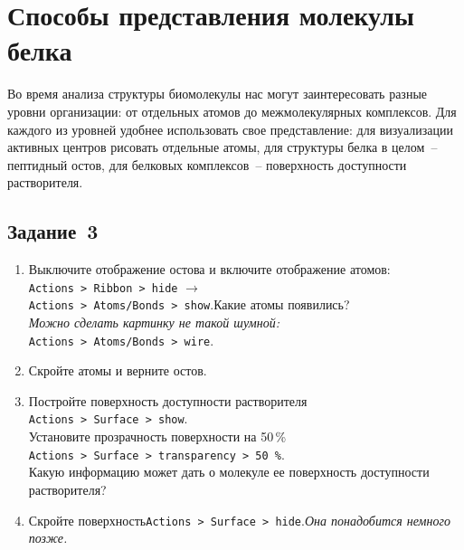 \section{Способы представления молекулы белка}
Во время анализа структуры биомолекулы нас могут заинтересовать разные уровни
организации: от отдельных атомов до межмолекулярных комплексов. Для каждого из уровней удобнее использовать свое представление:
для визуализации активных центров рисовать отдельные атомы, для структуры белка в целом~-- пептидный остов, для белковых
комплексов~-- поверхность доступности растворителя.

\subsection*{Задание~3}
\begin{enumerate}
    \item Выключите отображение остова и включите отображение атомов:\\\quad\texttt{Actions~> Ribbon~> hide}\quad
    $\rightarrow$\\\quad\texttt{Actions~> Atoms/Bonds~> show}.\quad Какие атомы появились? \\
    \textit{Можно сделать картинку не такой шумной:}\\\quad\texttt{Actions~> Atoms/Bonds~> wire}.
    \item Скройте атомы и верните остов.
    \item Постройте поверхность доступности растворителя\\\quad\texttt{Actions~> Surface~> show}.\quad\\ Установите прозрачность поверхности на 50\,\%\\
    \quad\texttt{Actions~> Surface~> transparency~> 50\,\%}.\quad\\Какую информацию может дать о молекуле ее поверхность доступности растворителя?
    \item Скройте поверхность\quad\texttt{Actions~> Surface~> hide}.\quad\textit{Она понадобится немного позже.}
\end{enumerate}